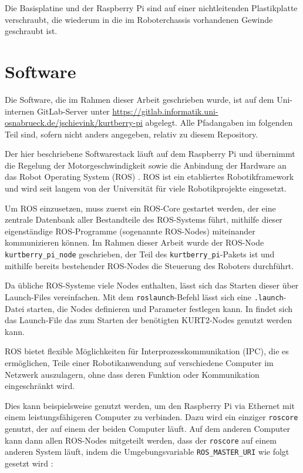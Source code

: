 \documentclass[german]{thesis_KBS}
\newcommand{\code}[1]{\texttt{#1}}  %
\begin{document}

Die Basisplatine und der Raspberry Pi sind auf einer nichtleitenden
Plastikplatte verschraubt, die wiederum in die im Roboterchassis vorhandenen
Gewinde geschraubt ist.



\chapter{Software}

Die Software, die im Rahmen dieser Arbeit geschrieben wurde, ist auf dem
Uni-internen GitLab-Server unter
\url{https://gitlab.informatik.uni-osnabrueck.de/jschievink/kurtberry-pi}
abgelegt. Alle Pfadangaben im folgenden Teil sind, sofern nicht anders
angegeben, relativ zu diesem Repository.

Der hier beschriebene Softwarestack läuft auf dem Raspberry Pi und übernimmt die
Regelung der Motorgeschwindigkeit sowie die Anbindung der Hardware an das Robot
Operating System (ROS) \cite{ros-web}. ROS ist ein etabliertes Robotikframework
und wird seit langem von der Universität für viele Robotikprojekte eingesetzt.

Um ROS einzusetzen, muss zuerst ein ROS-Core gestartet werden, der eine zentrale
Datenbank aller Bestandteile des ROS-Systems führt, mithilfe dieser
eigenständige ROS-Programme (sogenannte ROS-Nodes) miteinander kommunizieren
können. Im Rahmen dieser Arbeit wurde der ROS-Node \code{kurtberry\_pi\_node}
geschrieben, der Teil des \code{kurtberry\_pi}-Pakets ist und mithilfe bereits
bestehender ROS-Nodes die Steuerung des Roboters durchführt.

Da übliche ROS-Systeme viele Nodes enthalten, lässt sich das Starten dieser über
Launch-Files vereinfachen. Mit dem \code{roslaunch}-Befehl lässt sich eine
\code{.launch}-Datei starten, die Nodes definieren und Parameter festlegen kann.
In  findet sich das Launch-File das zum Starten der
benötigten KURT2-Nodes genutzt werden kann.

ROS bietet flexible Möglichkeiten für Interprozesskommunikation (IPC), die es
ermöglichen, Teile einer Robotikanwendung auf verschiedene Computer im Netzwerk
auszulagern, ohne dass deren Funktion oder Kommunikation eingeschränkt wird.

Dies kann beispielsweise genutzt werden, um den Raspberry Pi via Ethernet mit
einem leistungsfähigeren Computer zu verbinden. Dazu wird ein einziger
\code{roscore} genutzt, der auf einem der beiden Computer läuft. Auf dem anderen
Computer kann dann allen ROS-Nodes mitgeteilt werden, dass der \code{roscore}
auf einem anderen System läuft, indem die Umgebungsvariable
\code{ROS\_MASTER\_URI} wie folgt gesetzt wird \cite{roscore}:
\end{document}
